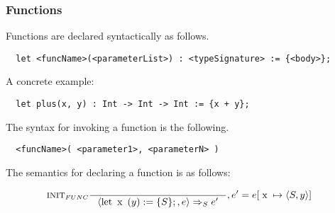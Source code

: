 \subsubsection{Functions}
\label{subsec:functions}

Functions are declared syntactically as follows.

\begin{verbatim}
  let <funcName>(<parameterList>) : <typeSignature> := {<body>};
\end{verbatim}

A concrete example:

\begin{verbatim}
  let plus(x, y) : Int -> Int -> Int := {x + y};
\end{verbatim}

The syntax for invoking a function is the following.

\begin{verbatim}
  <funcName>( <parameter1>, <parameterN> )
\end{verbatim}

The semantics for declaring a function is as follows:

\begin{align*}
&\inference[$\text{INIT}_{FUNC}$]{}
                         {\Braket{\Tlet \Tx(y) := \{S\};,e} \Rightarrow_S e'}
												 {, e' = e[\Tx \mapsto \Braket{S,y}]}
\end{align*}